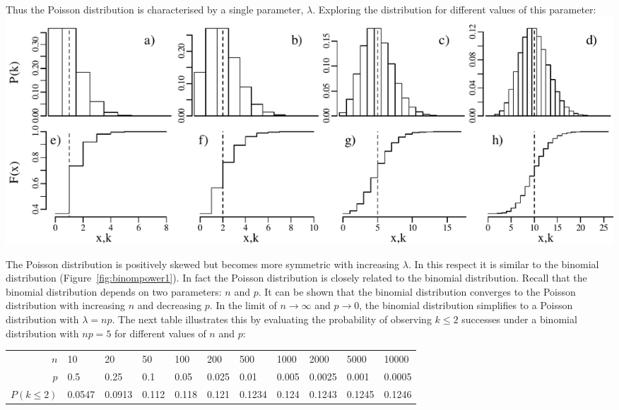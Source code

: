 Thus the Poisson distribution is characterised by a single parameter,
$\lambda$. Exploring the distribution for different values of this
parameter:\\

\noindent\includegraphics[width=\textwidth]{../figures/increasinglambda.pdf}
\begingroup {} \endgroup

The Poisson distribution is positively skewed but becomes more
symmetric with increasing $\lambda$. In this respect it is similar to
the binomial distribution (Figure~\ref{fig:binompower1}). In fact the
Poisson distribution is closely related to the binomial
distribution. Recall that the binomial distribution depends on two
parameters: $n$ and $p$. It can be shown that the binomial
distribution converges to the Poisson distribution with increasing $n$
and decreasing $p$. In the limit of $n \rightarrow \infty$ and $p
\rightarrow 0$, the binomial distribution simplifies to a Poisson
distribution with $\lambda = {n}{p}$. The next table illustrates this
by evaluating the probability of observing $k\leq{2}$ successes under
a binomial distribution with $np=5$ for different values of $n$ and
$p$:

\begin{center}
\begin{tabular}{r|llllllllll}
$n$ & 10 & 20 & 50 & 100 & 200 & 500 & 1000 & 2000 & 5000 & 10000 \\
$p$ & 0.5 & 0.25 & 0.1 & 0.05 & 0.025 & 0.01 & 0.005 & 0.0025 & 0.001 & 0.0005 \\
$P(k\leq{2})$ & 0.0547 & 0.0913 & 0.112 & 0.118 & 0.121 & 0.1234 & 0.124 & 0.1243 & 0.1245 & 0.1246\\
\end{tabular}
\end{center}

